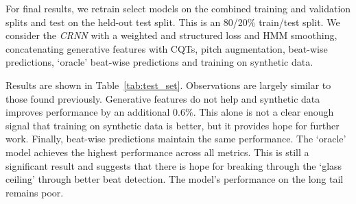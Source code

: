 For final results, we retrain select models on the combined training and validation splits and test on the held-out test split. This is an 80/20\% train/test split. We consider the \emph{CRNN} with a weighted and structured loss and HMM smoothing, concatenating generative features with CQTs, pitch augmentation, beat-wise predictions, `oracle' beat-wise predictions and training on synthetic data. 

Results are shown in Table~\ref{tab:test_set}. Observations are largely similar to those found previously. Generative features do not help and synthetic data improves performance by an additional $0.6\%$. This alone is not a clear enough signal that training on synthetic data is better, but it provides hope for further work. Finally, beat-wise predictions maintain the same performance. The `oracle' model achieves the highest performance across all metrics. This is still a significant result and suggests that there is hope for breaking through the `glass ceiling' through better beat detection. The model's performance on the long tail remains poor.

